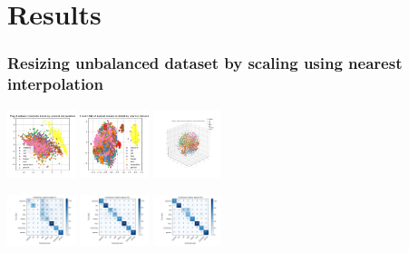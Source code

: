 \documentclass{article}
\begin{document}
\section{Results}
\begin{minipage}[c]{\textwidth}

\subsubsection{Resizing unbalanced dataset by scaling using nearest interpolation}
	\centering
\includegraphics[width= 0.15\textwidth]{./figures/pca_h64_w64_r_none.png}
\includegraphics[width= 0.15\textwidth]{./figures/pca_tsne_h64_w64_r_none.png}
\includegraphics[width= 0.15\textwidth]{./figures/tsne_h64_w64_r_none.png}	

\includegraphics[width= 0.15\textwidth]{./figures/cm_h64_w64_r_none_e0.png}
\includegraphics[width= 0.15\textwidth]{./figures/cm_h64_w64_r_none_e20.png}
\includegraphics[width= 0.15\textwidth]{./figures/cm_h64_w64_r_none_e49.png}

\end{minipage}
\end{document}
